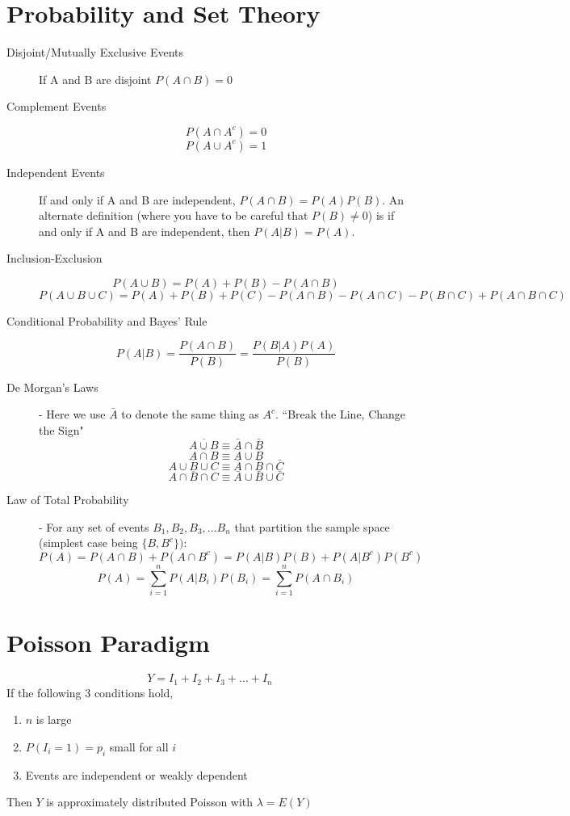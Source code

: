 \documentclass[11pt]{article}
\begin{document}
\section*{Probability and Set Theory}
\begin{description}
  \item[Disjoint/Mutually Exclusive Events] If A and B are disjoint  $P(A \cap B) = 0$
  \item[Complement Events] \[P(A \cap A^c) = 0\] \[P(A \cup A^c) = 1\]
  \item[Independent Events] If and only if A and B are independent, $P(A \cap B) = P(A)P(B)$. An alternate definition (where you have to be careful that $P(B) \neq 0$) is if and only if A and B are independent, then $P(A|B) = P(A)$.
  \item[Inclusion-Exclusion] \[P (A \cup B) = P(A) + P(B) - P(A \cap B)\] \[P (A \cup B \cup C) = P(A) + P(B) + P(C) - P(A \cap B) - P(A \cap C) - P(B \cap C) + P(A \cap B \cap C)\]
  \item[Conditional Probability and Bayes' Rule] \[P (A | B) = \frac{P(A \cap B)}{P(B)} = \frac{P(B | A) P(A)}{P(B)}\]
  \item[De Morgan's Laws] - Here we use $\bar{A}$ to denote the same thing as $A^c$. ``Break the Line, Change the Sign" \[\overline{A \cup B} \equiv \bar{A} \cap \bar{B}\] \[\overline{A \cap B} \equiv \bar{A} \cup \bar{B}\] \[\overline{A \cup B \cup C} \equiv \bar{A} \cap \bar{B} \cap \bar{C}\] \[\overline{A \cap B \cap C} \equiv \bar{A} \cup \bar{B} \cup \bar{C}\]
  \item[Law of Total Probability] - For any set of events $B_1, B_2, B_3, ... B_n$ that partition the sample space (simplest case being $\{B, B^c\})$: \[P(A) = P(A \cap B) + P(A \cap B^c) = P(A | B)P(B) + P(A | B^c)P(B^c)\] \[P(A) = \sum_{i=1}^{n}P(A | B_i)P(B_i) =  \sum_{i=1}^{n} P(A \cap B_i)\]
\end{description}

\section*{Poisson Paradigm}
\[Y = I_1 + I_2 + I_3 + \dots + I_n\]
If the following 3 conditions hold,
\begin{enumerate}\itemsep 0em
  \item $n$ is large
  \item $P(I_i = 1) = p_i$ small for all $i$
  \item Events are independent or weakly dependent \\
\end{enumerate}
Then $Y$ is approximately distributed Poisson with $\lambda = E(Y)$
\end{document}
